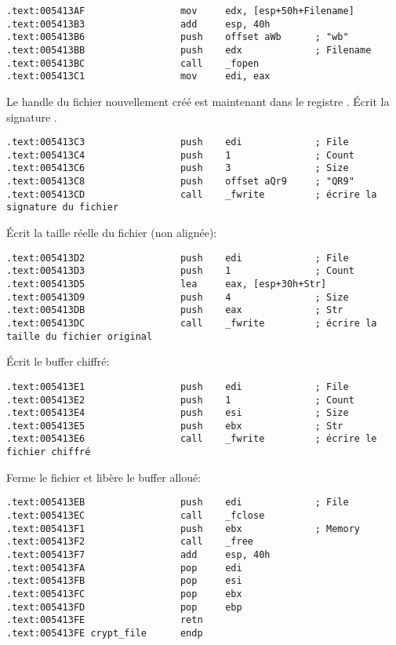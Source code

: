 \begin{lstlisting}[style=customasmx86]
.text:005413AF                 mov     edx, [esp+50h+Filename]
.text:005413B3                 add     esp, 40h
.text:005413B6                 push    offset aWb      ; "wb"
.text:005413BB                 push    edx             ; Filename
.text:005413BC                 call    _fopen
.text:005413C1                 mov     edi, eax
\end{lstlisting}

Le handle du fichier nouvellement créé est maintenant dans le registre \EDI. Écrit
la signature .

\begin{lstlisting}[style=customasmx86]
.text:005413C3                 push    edi             ; File
.text:005413C4                 push    1               ; Count
.text:005413C6                 push    3               ; Size
.text:005413C8                 push    offset aQr9     ; "QR9"
.text:005413CD                 call    _fwrite         ; écrire la signature du fichier
\end{lstlisting}

Écrit la taille réelle du fichier (non alignée):

\begin{lstlisting}[style=customasmx86]
.text:005413D2                 push    edi             ; File
.text:005413D3                 push    1               ; Count
.text:005413D5                 lea     eax, [esp+30h+Str]
.text:005413D9                 push    4               ; Size
.text:005413DB                 push    eax             ; Str
.text:005413DC                 call    _fwrite         ; écrire la taille du fichier original
\end{lstlisting}

Écrit le buffer chiffré:

\begin{lstlisting}[style=customasmx86]
.text:005413E1                 push    edi             ; File
.text:005413E2                 push    1               ; Count
.text:005413E4                 push    esi             ; Size
.text:005413E5                 push    ebx             ; Str
.text:005413E6                 call    _fwrite         ; écrire le fichier chiffré
\end{lstlisting}

Ferme le fichier et libère le buffer alloué:

\begin{lstlisting}[style=customasmx86]
.text:005413EB                 push    edi             ; File
.text:005413EC                 call    _fclose
.text:005413F1                 push    ebx             ; Memory
.text:005413F2                 call    _free
.text:005413F7                 add     esp, 40h
.text:005413FA                 pop     edi
.text:005413FB                 pop     esi
.text:005413FC                 pop     ebx
.text:005413FD                 pop     ebp
.text:005413FE                 retn
.text:005413FE crypt_file      endp
\end{lstlisting}


